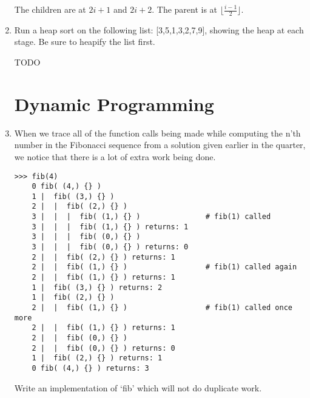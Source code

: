 \documentclass[11pt]{article}
\newenvironment{answer}{\large\lstset{basicstyle=\large}\color{white}}{}
\newenvironment{answer}{\large\lstset{basicstyle=\large}\color{red}}{}
\begin{document}
\begin{enumerate}
    \begin{answer}
    The children are at $2i+1$ and $2i+2$. The parent is at
    $\lfloor\frac{i-1}{2}\rfloor$.
    \end{answer}

\item Run a heap sort on the following list: [3,5,1,3,2,7,9], showing the heap
      at each stage. Be sure to heapify the list first.

    \begin{answer}
    \Huge TODO
    \end{answer}

\section*{Dynamic Programming}

\item When we trace all of the function calls being made while computing the
      n'th number in the Fibonacci sequence from a solution given earlier in
      the quarter, we notice that there is a lot of extra work being done.

      

\begin{verbatim}
>>> fib(4)
    0 fib( (4,) {} )
    1 |  fib( (3,) {} )
    2 |  |  fib( (2,) {} )
    3 |  |  |  fib( (1,) {} )               # fib(1) called
    3 |  |  |  fib( (1,) {} ) returns: 1
    3 |  |  |  fib( (0,) {} )
    3 |  |  |  fib( (0,) {} ) returns: 0
    2 |  |  fib( (2,) {} ) returns: 1
    2 |  |  fib( (1,) {} )                  # fib(1) called again
    2 |  |  fib( (1,) {} ) returns: 1
    1 |  fib( (3,) {} ) returns: 2
    1 |  fib( (2,) {} )
    2 |  |  fib( (1,) {} )                  # fib(1) called once more
    2 |  |  fib( (1,) {} ) returns: 1
    2 |  |  fib( (0,) {} )
    2 |  |  fib( (0,) {} ) returns: 0
    1 |  fib( (2,) {} ) returns: 1
    0 fib( (4,) {} ) returns: 3
\end{verbatim}

      Write an implementation of `fib' which will not do duplicate work.


\end{enumerate}
\end{document}
